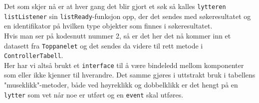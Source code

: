Det som skjer nå er at hver gang det blir gjort et søk så kalles \texttt{lytteren listListener} sin \texttt{listReady}-funksjon opp, der det sendes med søkeresultatet og en identifikator på hvilken type objekter som finnes i søkeresultatet.\\
Hvis man ser på kodesnutt nummer 2, så er det her det nå kommer inn et datasett fra \texttt{Toppanelet} og det sendes da videre til rett metode i \texttt{ControllerTabell}.\\
Her har vi altså brukt et \texttt{interface} til å være bindeledd mellom komponenter som eller ikke kjenner til hverandre. Det samme gjøres i uttstrakt bruk i tabellens "museklikk"-metoder, både ved høyreklikk og dobbelklikk er det hengt på en \texttt{lytter} som vet når noe er utført og en \texttt{event} skal utføres.
 
